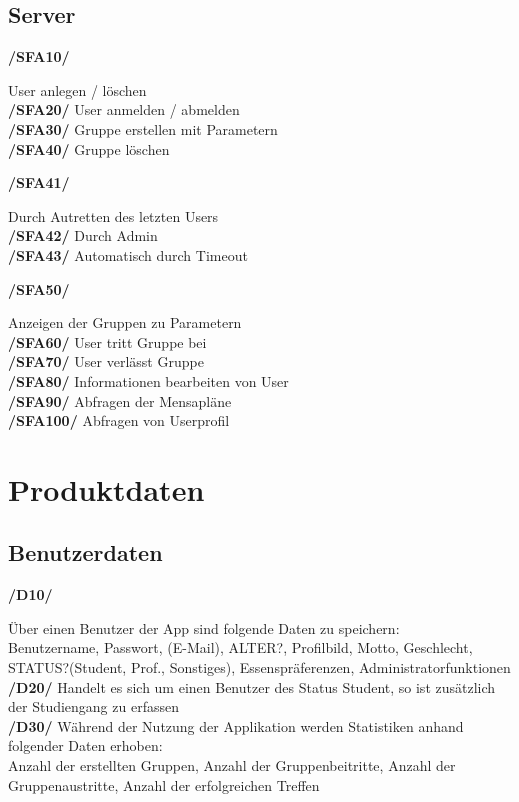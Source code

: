 \documentclass[a4paper]{scrreprt}
\begin{document}
\section{Server}

\begin{addmargin}[25pt]{0pt} 
\hypertarget{sfa10}{\textbf{/SFA10/}} User anlegen / löschen\\
\hypertarget{sfa20}{\textbf{/SFA20/}} User anmelden / abmelden\\
\hypertarget{sfa30}{\textbf{/SFA30/}} Gruppe erstellen mit Parametern\\
\hypertarget{sfa40}{\textbf{/SFA40/}} Gruppe löschen\\
	\begin{addmargin}[25pt]{0pt} 
	\hypertarget{sfa41}{\textbf{/SFA41/}} Durch Autretten des letzten Users\\
	\hypertarget{sfa42}{\textbf{/SFA42/}} Durch Admin\\
	\hypertarget{sfa43}{\textbf{/SFA43/}} Automatisch durch Timeout\\
	\end{addmargin}
\hypertarget{sfa50}{\textbf{/SFA50/}} Anzeigen der Gruppen zu Parametern\\
\hypertarget{sfa60}{\textbf{/SFA60/}} User tritt Gruppe bei\\
\hypertarget{sfa70}{\textbf{/SFA70/}} User verlässt Gruppe\\
\hypertarget{sfa80}{\textbf{/SFA80/}} Informationen bearbeiten von User\\
\hypertarget{sfa90}{\textbf{/SFA90/}} Abfragen der Mensapläne\\
\hypertarget{sfa100}{\textbf{/SFA100/}} Abfragen von Userprofil\\
\end{addmargin}

\chapter{Produktdaten}

\section{Benutzerdaten}

\begin{addmargin}[25pt]{0pt}
\hypertarget{d10}{\textbf{/D10/}} Über einen Benutzer der App sind folgende Daten zu speichern:\\
Benutzername, Passwort, (E-Mail), ALTER?, Profilbild, Motto, Geschlecht, STATUS?(Student, Prof., Sonstiges), Essenspräferenzen, Administratorfunktionen\\
\hypertarget{d20}{\textbf{/D20/}} Handelt es sich um einen Benutzer des Status Student, so ist zusätzlich der Studiengang zu erfassen\\
\hypertarget{d30}{\textbf{/D30/}} Während der Nutzung der Applikation werden Statistiken anhand folgender Daten erhoben:\\
Anzahl der erstellten Gruppen, Anzahl der Gruppenbeitritte, Anzahl der Gruppenaustritte, Anzahl der erfolgreichen Treffen\\
\end{addmargin}
\end{document}
